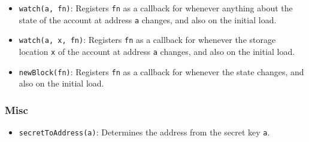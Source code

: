 \begin{itemize}
\item \texttt{watch(a, fn)}: Registers \texttt{fn} as a callback for whenever anything about the state of the account at address \texttt{a} changes, and also on the initial load.
\item \texttt{watch(a, x, fn)}: Registers \texttt{fn} as a callback for whenever the storage location \texttt{x} of the account at address \texttt{a} changes, and also on the initial load.
\item \texttt{newBlock(fn)}: Registers \texttt{fn} as a callback for whenever the state changes, and also on the initial load.
\end{itemize}

\subsubsection{Misc}

\begin{itemize}
\item \texttt{secretToAddress(a)}: Determines the address from the secret key \texttt{a}.
\end{itemize}

